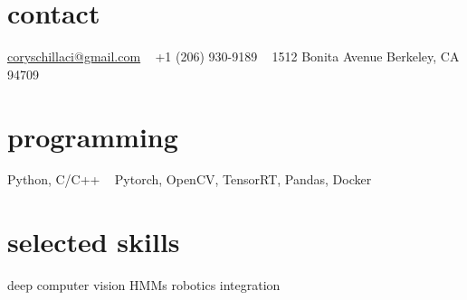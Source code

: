 \documentclass[]{friggeri-cv} %
\begin{document}


\begin{aside} %
\section{contact}
\href{mailto:coryschillaci@gmail.com}{coryschillaci@gmail.com}
~
+1 (206) 930-9189
~
1512 Bonita Avenue
Berkeley, CA 94709
\section{programming}
Python, C/C++
~
Pytorch, OpenCV, TensorRT, Pandas, Docker
\section{selected skills}
deep computer vision 
HMMs
robotics integration
\end{aside}

\end{document}
